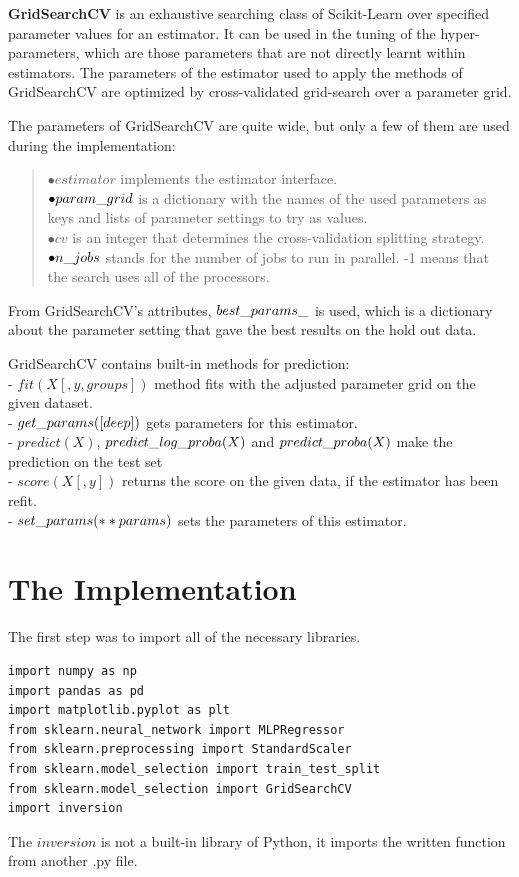 \newpage

\textbf{GridSearchCV} is an exhaustive searching class of Scikit-Learn over specified parameter values for an estimator. It can be used in the tuning of the hyper-parameters, which are those parameters that are not directly learnt within estimators. The parameters of the estimator used to apply the methods of GridSearchCV are optimized by cross-validated grid-search over a parameter grid.\medskip

\noindent The parameters of GridSearchCV are quite wide, but only a few of them are used during the implementation:
\begin{verse}
	$\bullet estimator$ implements the estimator interface. \\
	$\bullet param\char`_grid$ is a dictionary with the names of the used parameters as keys and lists of parameter settings to try as values.\\
	$\bullet cv$ is an integer that determines the cross-validation splitting strategy.\\
	$\bullet n\char`_jobs$ stands for the number of jobs to run in parallel. -1 means that the search uses all of the processors. 
\end{verse}

From GridSearchCV's attributes, $best\char`_params\char`_$ is used, which is a dictionary about the parameter setting that gave the best results on the hold out data.\medskip

\noindent GridSearchCV contains built-in methods for prediction:\\
- $fit(X[, y, groups])$ method fits with the adjusted parameter grid on the given dataset.\\
- $get\char`_params([deep])$ gets parameters for this estimator.\\
- $predict(X)$, $predict\char`_log\char`_proba(X)$ and $predict\char`_proba(X)$ make the prediction on the test set\\
- $score(X[, y])$ returns the score on the given data, if the estimator has been refit.\\
- $set\char`_params(**params)$ sets the parameters of this estimator.\bigskip


\section{The Implementation}

The first step was to import all of the necessary libraries.
\begin{lstlisting}
import numpy as np
import pandas as pd
import matplotlib.pyplot as plt
from sklearn.neural_network import MLPRegressor
from sklearn.preprocessing import StandardScaler
from sklearn.model_selection import train_test_split
from sklearn.model_selection import GridSearchCV
import inversion
\end{lstlisting}
The $inversion$ is not a built-in library of Python, it imports the written function from another .py file.\smallskip


